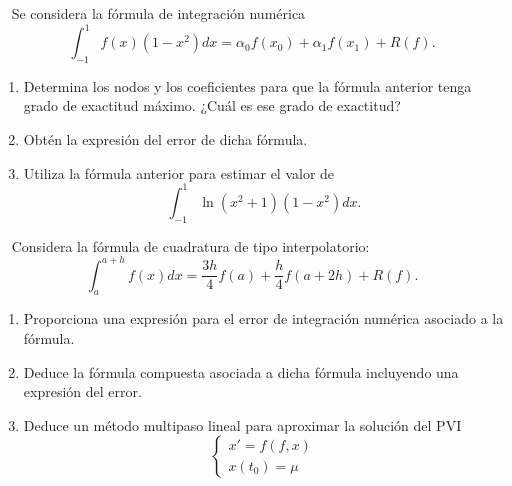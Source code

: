 \begin{ejercicio}~\label{ej:2.3.8}
    Se considera la fórmula de integración numérica
    \begin{equation*}
        \int_{-1}^{1} f(x)(1 - x^2)dx = \alpha_0 f(x_0) + \alpha_1 f(x_1) + R(f).
    \end{equation*}
    \begin{enumerate}
        \item Determina los nodos y los coeficientes para que la fórmula anterior tenga grado de exactitud máximo. ¿Cuál es ese grado de exactitud?
        \item Obtén la expresión del error de dicha fórmula.
        \item Utiliza la fórmula anterior para estimar el valor de
        \begin{equation*}
            \int_{-1}^{1} \ln(x^2 + 1)(1 - x^2)dx .
        \end{equation*}
    \end{enumerate}
\end{ejercicio}

\begin{ejercicio}~\label{ej:2.3.9}
    Considera la fórmula de cuadratura de tipo interpolatorio:
    \begin{equation*}
        \int_{a}^{a+h} f(x)dx = \frac{3h}{4}f(a) + \frac{h}{4}f(a + 2h) + R(f).
    \end{equation*}
    \begin{enumerate}
        \item Proporciona una expresión para el error de integración numérica asociado a la fórmula.
        \item Deduce la fórmula compuesta asociada a dicha fórmula incluyendo una expresión del error.
        \item Deduce un método multipaso lineal para aproximar la solución del PVI
        \begin{equation*}
            \begin{cases}
                x' = f(f, x) \\
                x(t_0) = \mu
            \end{cases}
        \end{equation*}
    \end{enumerate}
\end{ejercicio}






